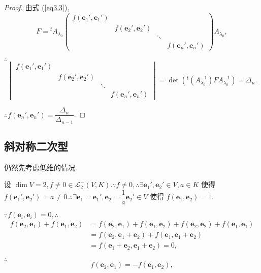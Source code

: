 \documentclass[color=black,device=normal,lang=cn,mode=geye]{elegantnote}
\begin{document}
\begin{proof}
    由式 (\ref{eq3.3}),
    \[F={}^tA_{\lambda_0}\begin{pmatrix}
        f(\boldsymbol{e}_1',\boldsymbol{e}_1') \\
        & f(\boldsymbol{e}_2',\boldsymbol{e}_2') \\
        && \ddots \\
        &&& f(\boldsymbol{e}_n',\boldsymbol{e}_n')
    \end{pmatrix}A_{\lambda_0},\]

    $\therefore$
    \[\begin{vmatrix}
        f(\boldsymbol{e}_1',\boldsymbol{e}_1') \\
        & f(\boldsymbol{e}_2',\boldsymbol{e}_2') \\
        && \ddots \\
        &&& f(\boldsymbol{e}_n',\boldsymbol{e}_n')
    \end{vmatrix}=\det({}^t(A_{\lambda_0}^{-1})FA_{\lambda_0}^{-1})=\Delta_n.\]

    $\therefore f(\boldsymbol{e}_n',\boldsymbol{e}_n')=\dfrac{\Delta_n}{\Delta_{n-1}}$.
\end{proof}
\subsection{斜对称二次型}
仍然先考虑低维的情况.

设 $\dim V=2,f\neq0\in\mathcal{L}_2^-(V,K).\because f\neq0,\therefore\exists\boldsymbol{e}_1',\boldsymbol{e}_2'\in V,a\in K$ 使得 $f(\boldsymbol{e}_1',\boldsymbol{e}_2')=a\neq0.\therefore\exists\boldsymbol{e}_1=\boldsymbol{e}_1',\boldsymbol{e}_2=\dfrac{1}{a}\boldsymbol{e}_2'\in V$ 使得 $f(\boldsymbol{e}_1,\boldsymbol{e}_2)=1$.

$\because f(\boldsymbol{e}_i,\boldsymbol{e}_i)=0,\therefore$
\begin{align*}
    f(\boldsymbol{e}_2,\boldsymbol{e}_1)+f(\boldsymbol{e}_1,\boldsymbol{e}_2) & =f(\boldsymbol{e}_2,\boldsymbol{e}_1)+f(\boldsymbol{e}_1,\boldsymbol{e}_2)+f(\boldsymbol{e}_2,\boldsymbol{e}_2)+f(\boldsymbol{e}_1,\boldsymbol{e}_1) \\
    & =f(\boldsymbol{e}_2,\boldsymbol{e}_1+\boldsymbol{e}_2)+f(\boldsymbol{e}_1,\boldsymbol{e}_1+\boldsymbol{e}_2) \\
    & =f(\boldsymbol{e}_1+\boldsymbol{e}_2,\boldsymbol{e}_1+\boldsymbol{e}_2)=0,
\end{align*}

$\therefore$
\[f(\boldsymbol{e}_2,\boldsymbol{e}_1)=-f(\boldsymbol{e}_1,\boldsymbol{e}_2),\]
\end{document}
